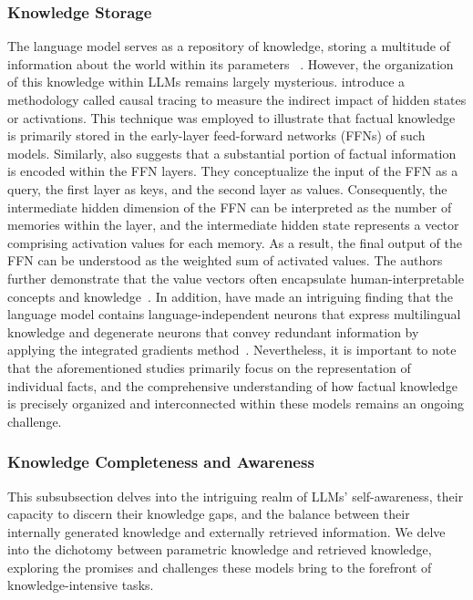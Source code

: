 \subsubsection{Knowledge Storage}
\label{sec:analy_store}
The language model serves as a repository of knowledge, storing a multitude of information about the world within its parameters ~\cite{petroni-etal-2019-language}. However, the organization of this knowledge within LLMs remains largely mysterious.
\cite{meng2022locating} introduce a methodology called causal tracing to measure the indirect impact of hidden states or activations. This technique was employed to illustrate that factual knowledge is primarily stored in the early-layer feed-forward networks (FFNs) of such models. 
Similarly, \citet{geva-etal-2021-transformer} also suggests that a substantial portion of factual information is encoded within the FFN layers. They conceptualize the input of the FFN as a query, the first layer as keys, and the second layer as values. Consequently, the intermediate hidden dimension of the FFN can be interpreted as the number of memories within the layer, and the intermediate hidden state represents a vector comprising activation values for each memory. As a result, the final output of the FFN can be understood as the weighted sum of activated values. The authors further demonstrate that the value vectors often encapsulate human-interpretable concepts and knowledge~\cite{geva-etal-2022-transformer,DBLP:journals/corr/abs-2304-14767}.
In addition, \citet{chen2023journey} have made an intriguing finding that the language model contains language-independent neurons that express multilingual knowledge and degenerate neurons that convey redundant information by applying the integrated gradients method~\cite{lundstrom2022rigorous}.
Nevertheless, it is important to note that the aforementioned studies primarily focus on the representation of individual facts, and the comprehensive understanding of how factual knowledge is precisely organized and interconnected within these models remains an ongoing challenge.

\subsubsection{Knowledge Completeness and Awareness}
\label{sec:analy_aware}

This subsubsection delves into the intriguing realm of LLMs' self-awareness, their capacity to discern their knowledge gaps, and the balance between their internally generated knowledge and externally retrieved information. We delve into the dichotomy between parametric knowledge and retrieved knowledge, exploring the promises and challenges these models bring to the forefront of knowledge-intensive tasks.


